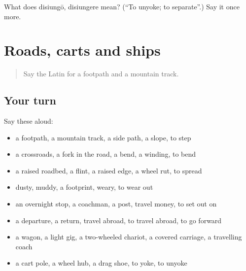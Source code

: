 \begin{tcolorbox}[breakable,colback=teal!4,colframe=teal!35!black,title={Before you move on}]
What does disiungō, disiungere mean? (\textquotedblleft{}To unyoke; to separate\textquotedblright{}.) Say it once more.
\end{tcolorbox}
\section[(dialogue)]{Roads, carts and ships}

\label{lesson:LA-R430-review-423-430}



\begin{quote}
Say the Latin for a footpath and a mountain track.
\end{quote}

\subsection*{Your turn}
Say these aloud:

\begin{itemize}
\raggedright
  \item a footpath, a mountain track, a side path, a slope, to step
  \item a crossroads, a fork in the road, a bend, a winding, to bend
  \item a raised roadbed, a flint, a raised edge, a wheel rut, to spread
  \item dusty, muddy, a footprint, weary, to wear out
  \item an overnight stop, a coachman, a post, travel money, to set out on
  \item a departure, a return, travel abroad, to travel abroad, to go forward
  \item a wagon, a light gig, a two-wheeled chariot, a covered carriage, a travelling coach
  \item a cart pole, a wheel hub, a drag shoe, to yoke, to unyoke
\end{itemize}


